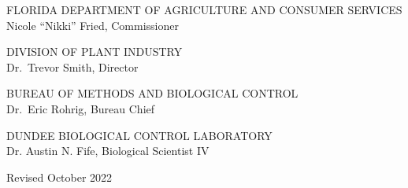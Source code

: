 \documentclass{sop_class}[overrideChapters] %
\begin{document}

\docBodyfalse
\begin{center}
    \thispagestyle{empty}%
      \vspace*{-0.4in}%
          \vfill%
            FLORIDA DEPARTMENT OF AGRICULTURE AND CONSUMER SERVICES\\
            {Nicole ``Nikki'' Fried}, Commissioner\\
            \bigbreak%
            
            DIVISION OF \MakeUppercase{Plant Industry}\\
            {Dr.~Trevor Smith}, Director\\
            \bigbreak%
            
            BUREAU OF \MakeUppercase{Methods and Biological Control}\\
            {Dr.~Eric Rohrig}, Bureau Chief\\
            \bigbreak%
             
            
            \vspace*{4in}%
            
            DUNDEE BIOLOGICAL CONTROL LABORATORY\\
            Dr. Austin N. Fife, Biological Scientist IV\\
            \bigbreak%
            
            Revised {October 2022}\\ 
          \vfill%
\end{center}
\newpage


\realSingleSpace
  \tableofcontents %


% 

\listoffigures
\end{document}

